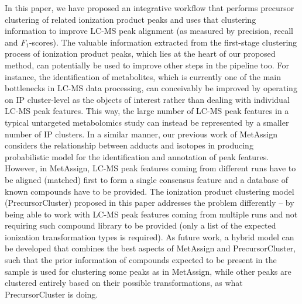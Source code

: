 In this paper, we have proposed an integrative workflow that performs precursor clustering of related ionization product peaks and uses that clustering information to improve LC-MS peak alignment (as measured by precision, recall and $F_1$-scores). The valuable information extracted from the first-stage clustering process of ionization product peaks, which lies at the heart of our proposed method, can potentially be used to improve other steps in the pipeline too. For instance, the identification of metabolites, which is currently one of the main bottlenecks in LC-MS data processing, can conceivably be improved by operating on IP cluster-level as the objects of interest rather than dealing with individual LC-MS peak features. This way, the large number of LC-MS peak features in a typical untargeted metabolomics study can instead be represented by a smaller number of IP clusters. In a similar manner, our previous work of MetAssign \cite{Daly2014} considers the relationship between adducts and isotopes in producing probabilistic model for the identification and annotation of peak features. However, in MetAssign, LC-MS peak features coming from different runs have to be aligned (matched) first to form a single consensus feature and a database of known compounds have to be provided. The ionization product clustering model (PrecursorCluster) proposed in this paper addresses the problem differently -- by being able to work with LC-MS peak features coming from multiple runs and not requiring such compound library to be provided (only a list of the expected ionization transformation types is required). As future work, a hybrid model can be developed that combines the best aspects of MetAssign and PrecursorCluster, such that the prior information of compounds expected to be present in the sample is used for clustering some peaks as in MetAssign, while other peaks are clustered entirely based on their possible transformations, as what PrecursorCluster is doing. 

